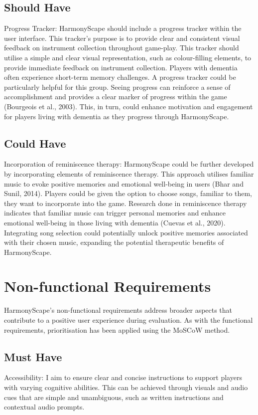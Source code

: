 \documentclass{l4proj}
\begin{document}
\subsection{Should Have}
Progress Tracker: HarmonyScape should include a progress tracker within the user interface. This tracker's purpose is to provide clear and consistent visual feedback on instrument collection throughout game-play. This tracker should utilise a simple and clear visual representation, such as colour-filling elements, to provide immediate feedback on instrument collection. Players with dementia often experience short-term memory challenges. A progress tracker could be particularly helpful for this group. Seeing progress can reinforce a sense of accomplishment and provides a clear marker of progress within the game (Bourgeois et al., 2003). This, in turn, could enhance motivation and engagement for players living with dementia as they progress through HarmonyScape.

\subsection{Could Have}
Incorporation of reminiscence therapy: HarmonyScape could be further developed by incorporating elements of reminiscence therapy. This approach utilises familiar music to evoke positive memories and emotional well-being in users (Bhar and Sunil, 2014).  Players could be given the option to choose songs, familiar to them, they want to incorporate into the game. Research done in reminiscence therapy indicates that familiar music can trigger personal memories and enhance emotional well-being in those living with dementia (Cuevas et al., 2020). Integrating song selection could potentially unlock positive memories associated with their chosen music, expanding the potential therapeutic benefits of HarmonyScape.

\section{Non-functional Requirements}
HarmonyScape's non-functional requirements address broader aspects that contribute to a positive user experience during evaluation. As with the functional requirements, prioritisation has been applied using the MoSCoW method.

\subsection{Must Have}
Accessibility: I aim to ensure clear and concise instructions to support players with varying cognitive abilities. This can be achieved through visuals and audio cues that are simple and unambiguous, such as written instructions and contextual audio prompts.
\end{document}
